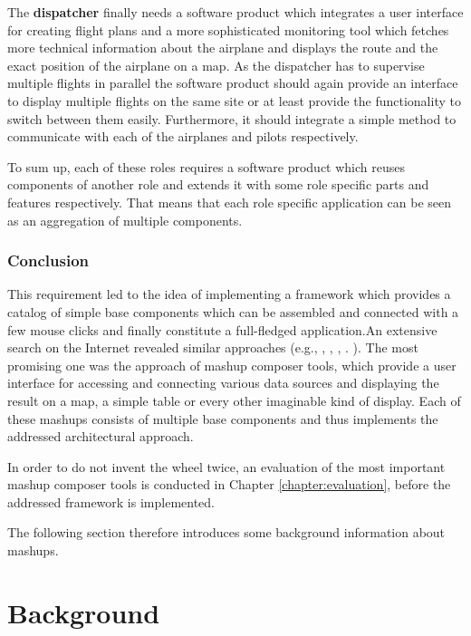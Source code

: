 The \textbf{dispatcher} finally needs a software product which integrates a user interface for
creating flight plans and a more sophisticated monitoring tool which fetches more technical
information about the airplane and displays the route and the exact position of the airplane on a
map. As the dispatcher has to supervise multiple flights in parallel the software product should
again provide an interface to display multiple flights on the same site or at least provide the
functionality to switch between them easily. Furthermore, it should integrate a simple method to
communicate with each of the airplanes and pilots respectively.

To sum up, each of these roles requires a software product which reuses components of another role
and extends it with some role specific parts and features respectively. That means that each role
specific application can be seen as an aggregation of multiple components.

\subsubsection{Conclusion}

This requirement led to the idea of implementing a framework which provides a catalog of simple base
components which can be assembled and connected with a few mouse clicks and finally constitute a
full-fledged application.\newline An extensive search on the Internet revealed similar approaches
(e.g., \cite{fast}, \cite{riena}, \cite{swordfish_whitepaper}, \cite{websphere_dashboard}.
\cite{aris_dashboard}). The most promising one was the approach of mashup composer tools,
which provide a user interface for accessing and connecting various data sources and displaying the
result on a map, a simple table or every other imaginable kind of display. Each of these mashups
consists of multiple base components and thus implements the addressed architectural approach.

In order to do not invent the wheel twice, an evaluation of the most important mashup composer
tools is conducted in Chapter \ref{chapter:evaluation}, before the addressed framework is
implemented.

The following section therefore introduces some background information about mashups.  

\section{Background}

